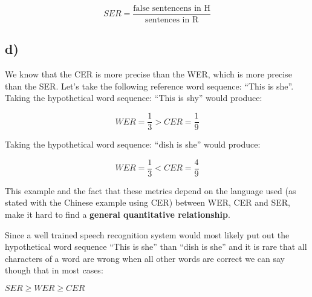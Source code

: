 \[
	SER = \frac{\text{false sentencens in H}}{\text{sentences in R}}
\]


\subsection*{d)} %
\label{sub:d}

We know that the CER is more precise than the WER, which is more precise than the SER. 
Let's take the following reference word sequence: ``This is she''.
Taking the hypothetical word sequence: ``This is shy'' would produce:

\[
	WER = \frac{1}{3} > CER = \frac{1}{9}
\]

Taking the hypothetical word sequence: ``dish is she'' would produce: 

\[
	WER = \frac{1}{3} < CER = \frac{4}{9}
\]

This example and the fact that these metrics depend on the language used (as stated with the Chinese example using CER) between WER, 
CER and SER, make it hard to find a \textbf{general quantitative relationship}.

Since a well trained speech recognition system would most likely put out the hypothetical word sequence ``This is she'' than 
``dish is she'' and it is rare that all characters of a word are wrong when all other words are correct
we can say though that in most cases: 

\centering \( SER \geq WER \geq CER \)

